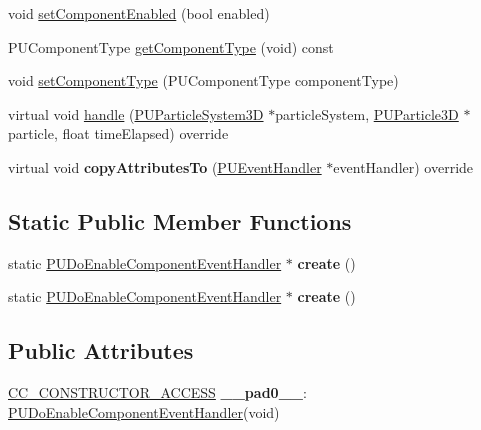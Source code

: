 \begin{DoxyCompactItemize}
\item 
void \hyperlink{classPUDoEnableComponentEventHandler_a1ea8207ead0eb09e3ff94743b3eef5ad}{set\+Component\+Enabled} (bool enabled)
\item 
P\+U\+Component\+Type \hyperlink{classPUDoEnableComponentEventHandler_aa0d64a91748ab3c16cd64843731be197}{get\+Component\+Type} (void) const
\item 
void \hyperlink{classPUDoEnableComponentEventHandler_a1d7742b4e01e3de32d6fb93952028353}{set\+Component\+Type} (P\+U\+Component\+Type component\+Type)
\item 
virtual void \hyperlink{classPUDoEnableComponentEventHandler_a6d84593dc83b908717c15a5c973d10b4}{handle} (\hyperlink{classPUParticleSystem3D}{P\+U\+Particle\+System3D} $\ast$particle\+System, \hyperlink{structPUParticle3D}{P\+U\+Particle3D} $\ast$particle, float time\+Elapsed) override
\item 
\mbox{\label{classPUDoEnableComponentEventHandler_a88f0af43c679563a60b4c1bff45428ea}} 
virtual void {\bfseries copy\+Attributes\+To} (\hyperlink{classPUEventHandler}{P\+U\+Event\+Handler} $\ast$event\+Handler) override
\end{DoxyCompactItemize}
\subsection*{Static Public Member Functions}
\begin{DoxyCompactItemize}
\item 
\mbox{\label{classPUDoEnableComponentEventHandler_a4cc7bceb243d180932abdcad96ae309b}} 
static \hyperlink{classPUDoEnableComponentEventHandler}{P\+U\+Do\+Enable\+Component\+Event\+Handler} $\ast$ {\bfseries create} ()
\item 
\mbox{\label{classPUDoEnableComponentEventHandler_a9ab310a1d9bdb45bd693630717e0748a}} 
static \hyperlink{classPUDoEnableComponentEventHandler}{P\+U\+Do\+Enable\+Component\+Event\+Handler} $\ast$ {\bfseries create} ()
\end{DoxyCompactItemize}
\subsection*{Public Attributes}
\begin{DoxyCompactItemize}
\item 
\mbox{\label{classPUDoEnableComponentEventHandler_a9d63082a15e39a4f8bd27c6003b74e1a}} 
\hyperlink{_2cocos2d_2cocos_2base_2ccConfig_8h_a25ef1314f97c35a2ed3d029b0ead6da0}{C\+C\+\_\+\+C\+O\+N\+S\+T\+R\+U\+C\+T\+O\+R\+\_\+\+A\+C\+C\+E\+SS} {\bfseries \+\_\+\+\_\+pad0\+\_\+\+\_\+}\+: \hyperlink{classPUDoEnableComponentEventHandler}{P\+U\+Do\+Enable\+Component\+Event\+Handler}(void)
\end{DoxyCompactItemize}

